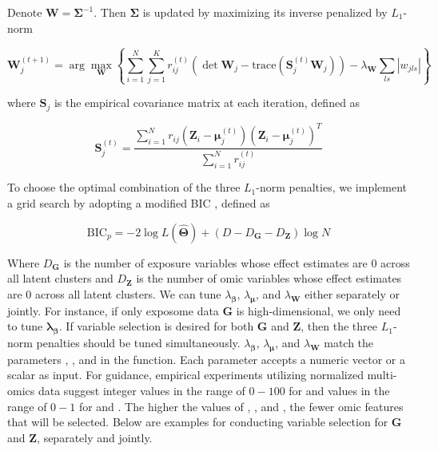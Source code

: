 Denote $\bm{W} = \bm{\Sigma}^{-1}$. Then $\bm \Sigma$ is updated by maximizing its inverse penalized by $L_1$-norm

\begin{equation}
    \bm{W}_j^{(t+1)} = \arg \max_{\bm W} \left \{ \sum_{i = 1}^N \sum_{j = 1}^K r_{ij}^{(t)}\left( \det \bm{W}_j - \text{trace}(\bm{S}_j^{(t)} \bm{W}_j) \right) - \lambda_{\bm{W}}\sum_{ls}|w_{jls}| \right \}
    \label{eq16}
\end{equation}

where $\bm S_j$ is the empirical covariance matrix at each iteration, defined as

\begin{equation}
    \bm{S}_j^{(t)} = \frac{\sum_{i=1}^N r_{ij}\left(\bm{Z}_i - \bm{\mu}_j^{(t)}\right)\left(\bm{Z}_i - \bm{\mu}_j^{(t)}\right)^T}{\sum_{i=1}^N r_{ij}^{(t)}}
    \label{eq17}
\end{equation}

To choose the optimal combination of the three $L_1$-norm penalties, we implement a grid search by adopting a modified BIC \citep{pan2007penalized}, defined as

\begin{equation}
    \text{BIC}_p = -2 \log L(\hat{\bm \Theta}) + (D - D_{\bm G} - D_{\bm Z})\log N
    \label{eq18}
\end{equation}

Where $D_{\bm G}$ is the number of exposure variables whose effect estimates are 0 across all latent clusters and $D_{\bm Z}$ is the number of omic variables whose effect estimates are 0 across all latent clusters. We can tune $\lambda_{\bm \beta}$, $\lambda_{\bm \mu}$, and $\lambda_{\bm W}$ either separately or jointly. For instance, if only exposome data $\bm G$ is high-dimensional, we only need to tune $\bm \lambda_{\bm \beta}$. If variable selection is desired for both $\bm G$ and $\bm Z$, then the three $L_1$-norm penalties should be tuned simultaneously. $\lambda_{\bm \beta}$, $\lambda_{\bm \mu}$, and $\lambda_{\bm W}$ match the parameters , , and  in the  function. Each parameter accepts a numeric vector or a scalar as input. For guidance, empirical experiments utilizing normalized multi-omics data suggest integer values in the range of $0 - 100$ for  and values in the range of $0 - 1$ for  and . The higher the values of , , and , the fewer omic features that will be selected. Below are examples for conducting variable selection for $\bm G$ and $\bm Z$, separately and jointly.

